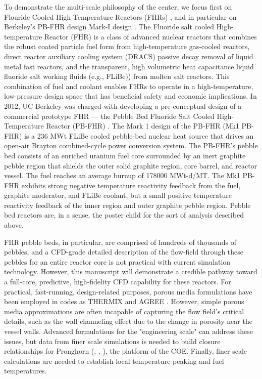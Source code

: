 To demonstrate the multi-scale philosophy of the center, we focus first on Flouride Cooled High-Temperature Reactors (FHRs) \cite{forsberg2015fluoride}, and in particular on Berkeley's PB-FHR design Mark-I design \cite{cisneros2014technical}. The Fluoride salt cooled High-temperature Reactor (FHR) is a class of advanced nuclear reactors that combines the robust coated particle fuel form from high-temperature gas-cooled reactors, direct reactor auxiliary cooling system (DRACS) passive decay removal of liquid metal fast reactors, and the transparent, high volumetric heat capacitance liquid fluoride salt working fluids (e.g., FLiBe)) from molten salt reactors. This combination of fuel and coolant enables FHRs to operate in a high-temperature, low-pressure design space that has beneficial safety and economic implications. In 2012, UC Berkeley was charged with developing a pre-conceptual design of a commercial prototype FHR --- the Pebble Bed Fluoride Salt Cooled High-Temperature Reactor (PB-FHR) \cite{cisneros2014technical}. The Mark 1 design of the PB-FHR (Mk1 PB-FHR) is a 236 MWt FLiBe cooled pebble-bed nuclear heat source that drives an open-air Brayton combined-cycle power conversion system. The PB-FHR's pebble bed consists of an enriched uranium fuel core surrounded by an inert graphite pebble region that shields the outer solid graphite region, core barrel, and reactor vessel. The fuel reaches an average burnup of 178000 MWt-d/MT. The Mk1 PB-FHR exhibits strong negative temperature reactivity feedback from the fuel, graphite moderator, and FLiBe coolant, but a small positive temperature reactivity feedback of the inner region and outer graphite pebble region. Pebble bed reactors are, in a sense, the poster child for the sort of analysis described above.

FHR pebble beds, in particular, are comprised of hundreds of thousands of pebbles, and a CFD-grade detailed description of the flow-field through these pebbles for an entire reactor core is not practical with current simulation technology. However, this manuscript will demonstrate a credible pathway toward a full-core, predictive, high-fidelity CFD capability for these reactors. For practical, fast-running, design-related purposes, porous media formulations have been employed in codes as THERMIX \cite{cleveland1986application} and AGREE \cite{seker2007multiphysics}. However, simple porous media approximations are often incapable of capturing the flow field's critical details, such as the wall channeling effect due to the change in porosity near the vessel walls.  Advanced formulations for the "engineering scale" can address these issues, but data from finer scale simulations is needed to build closure relationships for Pronghorn (\cite{novak2018pronghorn}, \cite{novak1}, \cite{novak2}), the platform of the COE. Finally, finer scale calculations are needed to establish local temperature peaking and fuel temperatures.

